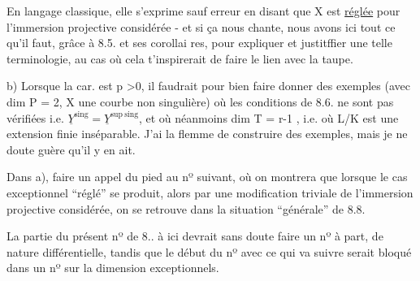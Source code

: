 \unsure{\hand{(}}En langage classique, elle s'exprime  sauf erreur en disant
que X est \uline{réglée} pour l'immersion projective considérée \hand{[}- et si ça nous
chante, nous avons ici  tout ce qu'il faut, grâce à 8.5. et ses corollai
res, pour expliquer et justitffier une telle terminologie, au cas où cela
t'inspirerait de faire le lien avec la taupe\over{)}{]}. 

b)  Lorsque la car. est p >0, il faudrait pour bien faire donner
des exemples (avec dim P = 2, X une courbe non singulière) où  les
conditions de 8.6. ne sont pas vérifiées i.e. $\underline{Y}^{\mathrm{sing}} = \underline{Y}^{\mathrm{sup\ sing}}$, et où
néanmoins  dim T = r-1 , i.e.  où  L/K est une extension finie
inséparable.  J'ai la flemme de construire des exemples, mais je ne
doute guère qu'il y en ait.

 Dans a), faire un appel du pied au  nº suivant,
où on montrera que lorsque le cas exceptionnel ``réglé'' se produit, alors 
par une modification triviale de l'immersion projective considérée, on
se retrouve dans la situation  ``générale''  de 8.8.

\margin{\unsure{$\|$}}La partie du présent nº de 8.. à ici  devrait sans doute faire
un nº à part, de nature différentielle,  tandis que le début du nº avec
ce qui va suivre serait bloqué dans un nº  sur  la dimension 
exceptionnels. 

